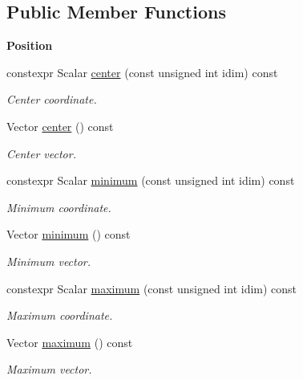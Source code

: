 \subsection*{Public Member Functions}
\begin{Indent}{\bf Position}\par
\begin{DoxyCompactItemize}
\item 
constexpr Scalar \hyperlink{classmagrathea_1_1AbstractHyperCube_a92d8e9710571e72fccd885ecedb4e075}{center} (const unsigned int idim) const 
\begin{DoxyCompactList}\small\item\em Center coordinate. \end{DoxyCompactList}\item 
Vector \hyperlink{classmagrathea_1_1AbstractHyperCube_a68e48d5ef5c0403770865b56c98a1494}{center} () const 
\begin{DoxyCompactList}\small\item\em Center vector. \end{DoxyCompactList}\item 
constexpr Scalar \hyperlink{classmagrathea_1_1AbstractHyperCube_a00245afe000222d837c1aa3cd09e08bd}{minimum} (const unsigned int idim) const 
\begin{DoxyCompactList}\small\item\em Minimum coordinate. \end{DoxyCompactList}\item 
Vector \hyperlink{classmagrathea_1_1AbstractHyperCube_a2efa04a1b5098cc7898f27aee16412fc}{minimum} () const 
\begin{DoxyCompactList}\small\item\em Minimum vector. \end{DoxyCompactList}\item 
constexpr Scalar \hyperlink{classmagrathea_1_1AbstractHyperCube_a1b36f49a44cecb681cc38e05a1a0c582}{maximum} (const unsigned int idim) const 
\begin{DoxyCompactList}\small\item\em Maximum coordinate. \end{DoxyCompactList}\item 
Vector \hyperlink{classmagrathea_1_1AbstractHyperCube_a3f589f4b3e788827941363ad9b97dc8e}{maximum} () const 
\begin{DoxyCompactList}\small\item\em Maximum vector. \end{DoxyCompactList}\end{DoxyCompactItemize}
\end{Indent}
